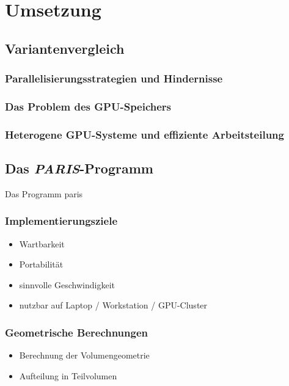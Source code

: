 \chapter{Umsetzung}

\section{Variantenvergleich}

\subsection{Parallelisierungsstrategien und Hindernisse}

\subsection{Das Problem des GPU-Speichers}

\subsection{Heterogene GPU-Systeme und effiziente Arbeitsteilung}

\section{Das \textit{PARIS}-Programm}

Das Programm \gls{paris}

\subsection{Implementierungsziele}

\begin{itemize}
    \item Wartbarkeit
    \item Portabilität
    \item sinnvolle Geschwindigkeit
    \item nutzbar auf Laptop / Workstation / GPU-Cluster
\end{itemize}

\subsection{Geometrische Berechnungen}

\begin{itemize}
    \item Berechnung der Volumengeometrie
    \item Aufteilung in Teilvolumen
\end{itemize}

